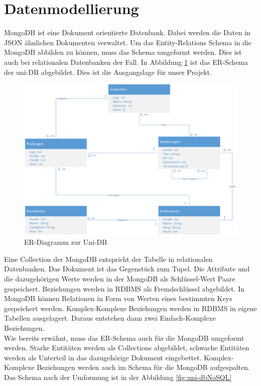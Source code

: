 \section{Datenmodellierung}
\label{kap:ERDiagramm}
MongoDB ist eine Dokument orientierte Datenbank. Dabei werden die Daten in JSON
ähnlichen Dokumenten verwaltet. Um das Entity-Relations Schema in die MongoDB
abbilden zu können, muss das Schema umgeformt werden. Dies ist auch bei
relationalen Datenbanken der Fall. In Abbildung \ref{fig:uni-db} ist das
ER-Schema der uni-DB abgebildet. Dies ist die Ausgangslage für unser Projekt.
\begin{figure}[h] 
	\centering
		\includegraphics[width=1\textwidth]{./pictures/NoSQL-DB_ER_Diagramm_UNI-DB.png}
	\caption{ER-Diagramm zur Uni-DB}
	\label{fig:uni-db}
\end{figure}
Eine Collection der MongoDB entspricht der Tabelle in relationalen Datenbanken.
Das Dokument ist das Gegenstück zum Tupel. Die Attribute und die dazugehörigen
Werte werden in der MongoDB als Schlüssel-Wert Paare gespeichert.
Beziehungen werden in RDBMS als Fremdschlüssel abgebildet. In MongoDB 
können Relationen in Form von Werten eines bestimmten Keys gespeichert werden.
Komplex-Komplexe Beziehungen werden in RDBMS in eigene
Tabellen ausgelagert. Daraus entstehen dann zwei Einfach-Komplexe
Beziehungen. \\
Wie bereits erwähnt, muss das ER-Schema auch für die MongoDB umgeformt werden.
Starke Entitäten werden als Collections abgebildet, schwache Entitäten werden 
als Unterteil in das dazugehörige Dokument eingebettet. Komplex-Komplexe 
Beziehungen werden auch im Schema für die MongoDB aufgespalten.
Das Schema nach der Umformung ist in der Abbildung \ref{fig:uni-dbNoSQL}
